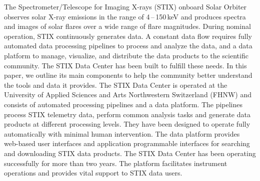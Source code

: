 \documentclass[referee]{aa} %
\begin{document}
  \abstract
   {The Spectrometer/Telescope for Imaging X-rays (STIX) onboard Solar Orbiter observes solar X-ray emissions in the range of 4\,--\,150\,keV and produces spectra and images of solar flares over a wide range of flare magnitudes.  During nominal operation, STIX continuously generates data. 
   A constant data flow requires fully automated data processing pipelines to process and analyze the data, and a data platform to manage, visualize, and distribute the data products to the scientific community.  
   } %
   {The STIX Data Center has been built to fulfill these needs.  In this paper, we outline its main components to help the community better understand the tools and data it provides.
   }
   {
   The STIX Data Center is operated at the University of Applied Sciences and Arts Northwestern Switzerland (FHNW) and consists of automated processing pipelines and a data platform.  The pipelines process STIX telemetry data, perform common analysis tasks and generate data products at different processing levels. They have been designed to operate fully automatically with minimal human intervention.  The data platform provides web-based user interfaces and application programmable interfaces for searching and downloading STIX data products.
   }
   {
   The STIX Data Center has been operating successfully for more than two years. The platform facilitates instrument operations and provides vital support to STIX data users.}
 {}
   \maketitle

\end{document}
